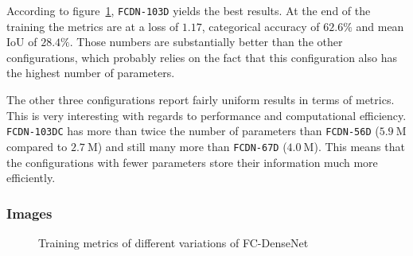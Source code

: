 According to figure~\ref{fig:densenet_train_metrics}, \texttt{FCDN-103D} yields the best results. At the end of the training the metrics are at a loss of $1.17$, categorical accuracy of $62.6\%$ and mean IoU of $28.4\%$. Those numbers are substantially better than the other configurations, which probably relies on the fact that this configuration also has the highest number of parameters.

The other three configurations report fairly uniform results in terms of metrics. This is very interesting with regards to performance and computational efficiency. \texttt{FCDN-103DC} has more than twice the number of parameters than \texttt{FCDN-56D} ($5.9~\text{M}$ compared to $2.7~\text{M}$) and still many more than \texttt{FCDN-67D} ($4.0~\text{M}$). This means that the configurations with fewer parameters store their information much more efficiently.

\subsubsection{Images}

\begin{figure}
    \newcommand{\DensenetMetricsImageWidth}{0.32\textwidth}
    \centering
            
    \caption{Training metrics of different variations of FC-DenseNet}
    \label{fig:densenet_train_metrics}
\end{figure}

